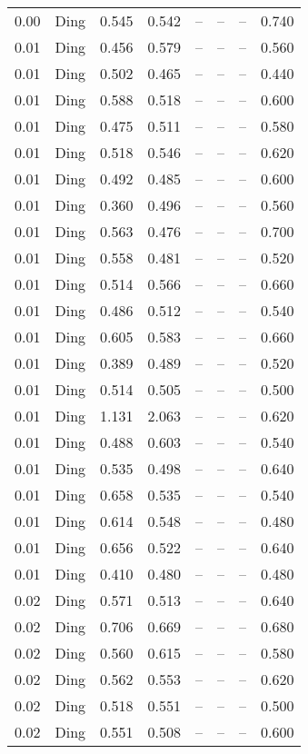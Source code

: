 \begin{table}[H]
\begin{tabular}{l c l l l}
0.00 & Ding & 0.545 & 0.542 & -- & -- & -- & 0.740 \\
0.01 & Ding & 0.456 & 0.579 & -- & -- & -- & 0.560 \\
0.01 & Ding & 0.502 & 0.465 & -- & -- & -- & 0.440 \\
0.01 & Ding & 0.588 & 0.518 & -- & -- & -- & 0.600 \\
0.01 & Ding & 0.475 & 0.511 & -- & -- & -- & 0.580 \\
0.01 & Ding & 0.518 & 0.546 & -- & -- & -- & 0.620 \\
0.01 & Ding & 0.492 & 0.485 & -- & -- & -- & 0.600 \\
0.01 & Ding & 0.360 & 0.496 & -- & -- & -- & 0.560 \\
0.01 & Ding & 0.563 & 0.476 & -- & -- & -- & 0.700 \\
0.01 & Ding & 0.558 & 0.481 & -- & -- & -- & 0.520 \\
0.01 & Ding & 0.514 & 0.566 & -- & -- & -- & 0.660 \\
0.01 & Ding & 0.486 & 0.512 & -- & -- & -- & 0.540 \\
0.01 & Ding & 0.605 & 0.583 & -- & -- & -- & 0.660 \\
0.01 & Ding & 0.389 & 0.489 & -- & -- & -- & 0.520 \\
0.01 & Ding & 0.514 & 0.505 & -- & -- & -- & 0.500 \\
0.01 & Ding & 1.131 & 2.063 & -- & -- & -- & 0.620 \\
0.01 & Ding & 0.488 & 0.603 & -- & -- & -- & 0.540 \\
0.01 & Ding & 0.535 & 0.498 & -- & -- & -- & 0.640 \\
0.01 & Ding & 0.658 & 0.535 & -- & -- & -- & 0.540 \\
0.01 & Ding & 0.614 & 0.548 & -- & -- & -- & 0.480 \\
0.01 & Ding & 0.656 & 0.522 & -- & -- & -- & 0.640 \\
0.01 & Ding & 0.410 & 0.480 & -- & -- & -- & 0.480 \\
0.02 & Ding & 0.571 & 0.513 & -- & -- & -- & 0.640 \\
0.02 & Ding & 0.706 & 0.669 & -- & -- & -- & 0.680 \\
0.02 & Ding & 0.560 & 0.615 & -- & -- & -- & 0.580 \\
0.02 & Ding & 0.562 & 0.553 & -- & -- & -- & 0.620 \\
0.02 & Ding & 0.518 & 0.551 & -- & -- & -- & 0.500 \\
0.02 & Ding & 0.551 & 0.508 & -- & -- & -- & 0.600 \\

\end{tabular}
\end{table}

